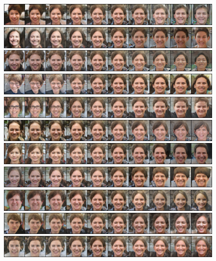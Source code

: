 \documentclass{article}
\begin{document}
\begin{figure}[H]
  \centering
  \includegraphics[width=0.9\linewidth]{eigen/raw_gan_15.png}
  \includegraphics[width=0.9\linewidth]{eigen/raw_gan_16.png}
  \includegraphics[width=0.9\linewidth]{eigen/raw_gan_17.png}
  \includegraphics[width=0.9\linewidth]{eigen/raw_gan_18.png}
  \includegraphics[width=0.9\linewidth]{eigen/raw_gan_19.png}
  \includegraphics[width=0.9\linewidth]{eigen/raw_gan_20.png}
  \includegraphics[width=0.9\linewidth]{eigen/raw_gan_21.png}
  \includegraphics[width=0.9\linewidth]{eigen/raw_gan_22.png}
  \includegraphics[width=0.9\linewidth]{eigen/raw_gan_23.png}
  \includegraphics[width=0.9\linewidth]{eigen/raw_gan_24.png}
  \includegraphics[width=0.9\linewidth]{eigen/raw_gan_25.png}

\end{figure}
\end{document}
